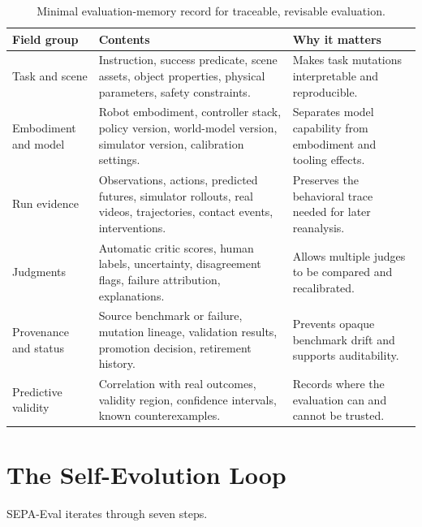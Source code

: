 \documentclass[sigconf,review,anonymous]{acmart}
\newcommand{\system}{SEPA-Eval\xspace}
\begin{document}
\begin{table}[t]
\centering
\caption{Minimal evaluation-memory record for traceable, revisable evaluation.}
\label{tab:memory-schema}
\small
\begin{tabular}{p{}p{}p{}}
\toprule
\textbf{Field group} & \textbf{Contents} & \textbf{Why it matters} \\
\midrule
Task and scene & Instruction, success predicate, scene assets, object properties, physical parameters, safety constraints. & Makes task mutations interpretable and reproducible. \\
Embodiment and model & Robot embodiment, controller stack, policy version, world-model version, simulator version, calibration settings. & Separates model capability from embodiment and tooling effects. \\
Run evidence & Observations, actions, predicted futures, simulator rollouts, real videos, trajectories, contact events, interventions. & Preserves the behavioral trace needed for later reanalysis. \\
Judgments & Automatic critic scores, human labels, uncertainty, disagreement flags, failure attribution, explanations. & Allows multiple judges to be compared and recalibrated. \\
Provenance and status & Source benchmark or failure, mutation lineage, validation results, promotion decision, retirement history. & Prevents opaque benchmark drift and supports auditability. \\
Predictive validity & Correlation with real outcomes, validity region, confidence intervals, known counterexamples. & Records where the evaluation can and cannot be trusted. \\
\bottomrule
\end{tabular}
\end{table}

\section{The Self-Evolution Loop}

\system iterates through seven steps.
\end{document}
